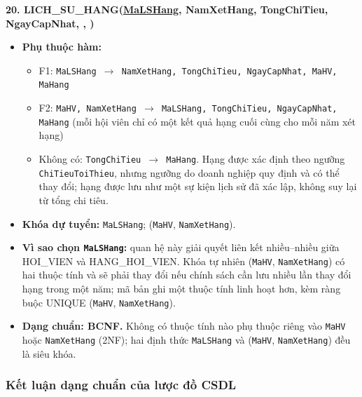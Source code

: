 \documentclass[11pt, a4paper]{article}
\newcommand{\pk}[1]{\bgroup\ULdepth=1.8pt\uline{#1}\egroup}
\newcommand{\fk}[1]{\bgroup\ULdepth=1.8pt\dashuline{#1}\egroup}
\begin{document}
\textbf{20. LICH\_SU\_HANG(\pk{MaLSHang}, NamXetHang, TongChiTieu, NgayCapNhat, \fk{MaHV}, \fk{MaHang})}
\begin{itemize}
    \item \textbf{Phụ thuộc hàm:}
    \begin{itemize}
        \item F1: \texttt{MaLSHang $\rightarrow$ NamXetHang, TongChiTieu, NgayCapNhat, MaHV, MaHang}
        \item F2: \texttt{MaHV, NamXetHang $\rightarrow$ MaLSHang, TongChiTieu, NgayCapNhat, MaHang} (mỗi hội viên chỉ có một kết quả hạng cuối cùng cho mỗi năm xét hạng)
        \item Không có: \texttt{TongChiTieu $\rightarrow$ MaHang}. Hạng được xác định theo ngưỡng \texttt{ChiTieuToiThieu}, nhưng ngưỡng do doanh nghiệp quy định và có thể thay đổi; hạng được lưu như một sự kiện lịch sử đã xác lập, không suy lại từ tổng chi tiêu.
    \end{itemize}
    \item \textbf{Khóa dự tuyển:} \texttt{MaLSHang}; (\texttt{MaHV}, \texttt{NamXetHang}).
    \item \textbf{Vì sao chọn \texttt{MaLSHang}:} quan hệ này giải quyết liên kết nhiều--nhiều giữa HOI\_VIEN và HANG\_HOI\_VIEN. Khóa tự nhiên (\texttt{MaHV}, \texttt{NamXetHang}) có hai thuộc tính và sẽ phải thay đổi nếu chính sách cần lưu nhiều lần thay đổi hạng trong một năm; mã bản ghi một thuộc tính linh hoạt hơn, kèm ràng buộc UNIQUE (\texttt{MaHV}, \texttt{NamXetHang}).
    \item \textbf{Dạng chuẩn: BCNF.} Không có thuộc tính nào phụ thuộc riêng vào \texttt{MaHV} hoặc \texttt{NamXetHang} (2NF); hai định thức \texttt{MaLSHang} và (\texttt{MaHV}, \texttt{NamXetHang}) đều là siêu khóa.
\end{itemize}

\subsubsection{Kết luận dạng chuẩn của lược đồ CSDL}
\end{document}
